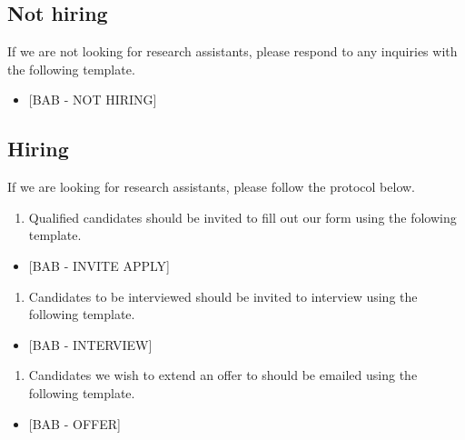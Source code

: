 \documentclass[]{book}
\providecommand{\tightlist}{%
  \setlength{\itemsep}{0pt}\setlength{\parskip}{0pt}}
\begin{document}
\hypertarget{not-hiring}{%
\subsection{Not hiring}\label{not-hiring}}

If we are not looking for research assistants, please respond to any inquiries with the following template.

\begin{itemize}
\tightlist
\item
  {[}BAB - NOT HIRING{]}
\end{itemize}

\hypertarget{hiring}{%
\subsection{Hiring}\label{hiring}}

If we are looking for research assistants, please follow the protocol below.

\begin{enumerate}
\def\labelenumi{\arabic{enumi}.}
\tightlist
\item
  Qualified candidates should be invited to fill out our form using the folowing template.
\end{enumerate}

\begin{itemize}
\tightlist
\item
  {[}BAB - INVITE APPLY{]}
\end{itemize}

\begin{enumerate}
\def\labelenumi{\arabic{enumi}.}
\setcounter{enumi}{1}
\tightlist
\item
  Candidates to be interviewed should be invited to interview using the following template.
\end{enumerate}

\begin{itemize}
\tightlist
\item
  {[}BAB - INTERVIEW{]}
\end{itemize}

\begin{enumerate}
\def\labelenumi{\arabic{enumi}.}
\setcounter{enumi}{2}
\tightlist
\item
  Candidates we wish to extend an offer to should be emailed using the following template.
\end{enumerate}

\begin{itemize}
\tightlist
\item
  {[}BAB - OFFER{]}
\end{itemize}
\end{document}
